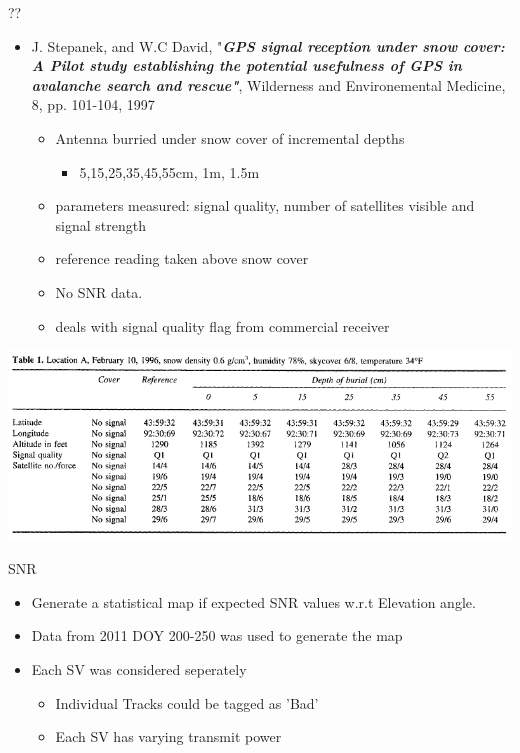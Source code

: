\documentclass{beamer}
\begin{document}
\begin{frame}{??}
  \begin{itemize}
  \item J. Stepanek, and W.C David, "\emph{\bf GPS signal reception under snow cover: A Pilot study establishing the potential usefulness of GPS in avalanche search and rescue"}, Wilderness and Environemental Medicine, 8, pp. 101-104, 1997
    \begin{itemize}
    \item Antenna burried under snow cover of incremental depths
      \begin{itemize}
         \item 5,15,25,35,45,55cm, 1m, 1.5m
      \end{itemize}
    \item parameters measured: signal quality, number of satellites visible and signal strength
    \item reference reading taken above snow cover
    \item No SNR data.
    \item deals with signal quality flag from commercial receiver
    \end{itemize}
  \end{itemize}

\end{frame}

\begin{frame}
  \includegraphics[width=1\linewidth,clip=true]{paper_snow_cover_tbl1.png}
\end{frame}


\begin{frame}{SNR}
  \begin{itemize}
  \item Generate a statistical map if expected SNR values w.r.t Elevation angle.
  \item Data from 2011 DOY 200-250 was used to generate the map
  \item Each SV was considered seperately
    \begin{itemize}
    \item Individual Tracks could be tagged as 'Bad'
    \item Each SV has varying transmit power
    \end{itemize}
  \end{itemize}
\end{frame}
\end{document}
